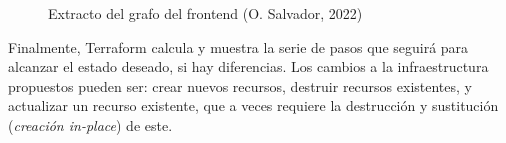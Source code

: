 \documentclass[11pt]{article}
\begin{document}
\begin{flushleft}
		\medskip
		
		\begin{figure}[htb]
			\centering
			\caption{Extracto del grafo del frontend (O. Salvador, 2022)}
		\end{figure}
		
		\clearpage
		
		Finalmente, Terraform calcula y muestra la serie de pasos que seguirá para alcanzar el estado deseado, si hay diferencias. Los cambios a la infraestructura propuestos pueden ser: crear nuevos recursos, destruir recursos existentes, y actualizar un recurso existente, que a veces requiere la destrucción y sustitución (\textit{creación in-place}) de este.
		\linebreak
		

\end{flushleft}
\end{document}
